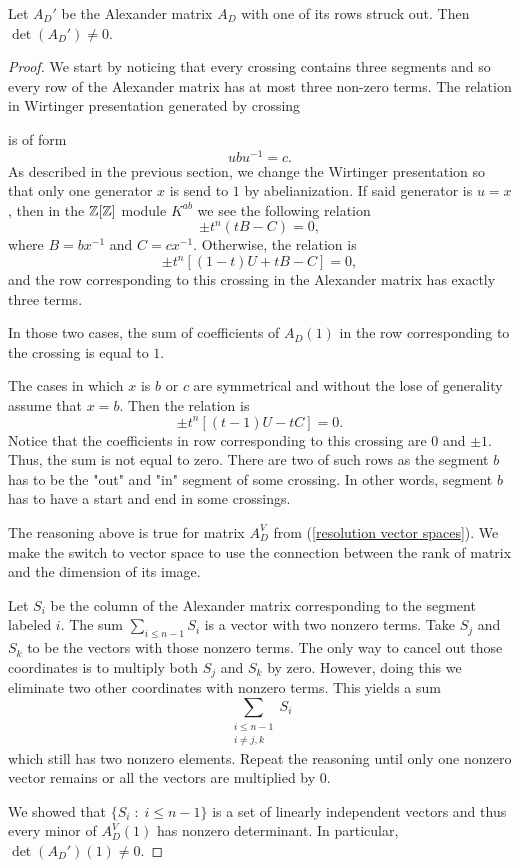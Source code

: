 \begin{proposition}\label{alexander matrix has trivial kernel}
  Let $A_D'$ be the Alexander matrix $A_D$ with one of its rows struck out. Then $\det(A_D')\neq 0$.
\end{proposition}

\begin{proof}
  We start by noticing that every crossing contains three segments and so every row of the Alexander matrix has at most three non-zero terms. The relation in Wirtinger presentation generated by crossing 
  \begin{center}
  \end{center}
  is of form
  $$ubu^{-1}=c.$$
  As described in the previous section, we change the Wirtinger presentation so that only one generator $x$ is send to $1$ by abelianization. If said generator is $u=x$, then in the $\operatorname{\mathbb{Z}}[\operatorname{\mathbb{Z}}]$ module $K^{ab}$ we see the following relation 
  $$\pm t^n(tB-C)=0,$$
  where $B=bx^{-1}$ and $C=cx^{-1}$. Otherwise, the relation is
  $$\pm t^n[(1-t)U+tB-C]=0,$$
  and the row corresponding to this crossing in the Alexander matrix has exactly three terms.

  In those two cases, the sum of coefficients of $A_D(1)$ in the row corresponding to the crossing is equal to $1$.

  The cases in which $x$ is $b$ or $c$ are symmetrical and without the lose of generality assume that $x=b$. Then the relation is 
  $$\pm t^n[(t-1)U-tC]=0.$$
  Notice that the coefficients in row corresponding to this crossing are $0$ and $\pm1$. Thus, the sum is not equal to zero. There are two of such rows as the segment $b$ has to be the "out" and "in" segment of some crossing. In other words, segment $b$ has to have a start and end in some crossings.

  The reasoning above is true for matrix $A_D^V$ from (\ref{resolution vector spaces}). We make the switch to vector space to use the connection between the rank of matrix and the dimension of its image.

  Let $S_i$ be the column of the Alexander matrix corresponding to the segment labeled $i$. The sum $\sum_{i\leq n-1} S_i$ is a vector with two nonzero terms. Take $S_j$ and $S_k$ to be the vectors with those nonzero terms. The only way to cancel out those coordinates is to multiply both $S_j$ and $S_k$ by zero. However, doing this we eliminate two other coordinates with nonzero terms. This yields a sum
  $$\sum_{\substack{i\leq n-1 \\ i\neq j,k}}S_i$$ 
  which still has two nonzero elements. Repeat the reasoning until only one nonzero vector remains or all the vectors are multiplied by $0$.

  We showed that $\{S_i\;:\;i\leq n-1\}$ is a set of linearly independent vectors and thus every minor of $A_D^V(1)$ has nonzero determinant. In particular, $\det(A_D')(1)\neq 0$.
\end{proof}

